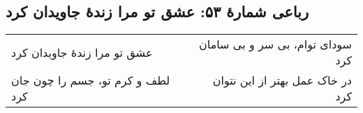 \begin{center}
\section*{رباعی شمارهٔ ۵۳: عشق تو مرا زندۀ جاویدان کرد}
\label{sec:053}
\begin{longtable}{l p{0.5cm} r}
عشق تو مرا زندهٔ جاویدان کرد
&&
سودای توام، بی سر و بی سامان کرد
\\
لطف و کرم تو، جسم را چون جان کرد
&&
در خاک عمل بهتر از این نتوان کرد
\\
\end{longtable}
\end{center}

